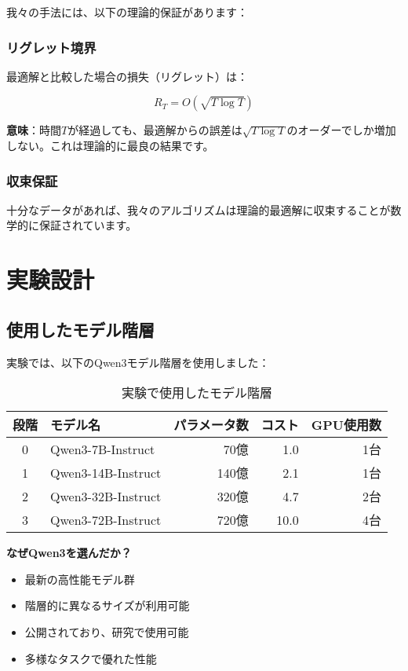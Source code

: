 \documentclass[a4paper,12pt]{jsarticle}
\begin{document}
我々の手法には、以下の理論的保証があります：

\subsubsection{リグレット境界}

最適解と比較した場合の損失（リグレット）は：

\begin{equation}
R_T = O(\sqrt{T \log T})
\end{equation}

\textbf{意味}：時間$T$が経過しても、最適解からの誤差は$\sqrt{T \log T}$のオーダーでしか増加しない。これは理論的に最良の結果です。

\subsubsection{収束保証}

十分なデータがあれば、我々のアルゴリズムは理論的最適解に収束することが数学的に保証されています。

\section{実験設計}

\subsection{使用したモデル階層}

実験では、以下のQwen3モデル階層を使用しました：

\begin{table}[H]
\centering
\caption{実験で使用したモデル階層}
\begin{tabular}{|c|l|r|r|r|}
\hline
\textbf{段階} & \textbf{モデル名} & \textbf{パラメータ数} & \textbf{コスト} & \textbf{GPU使用数} \\
\hline
0 & Qwen3-7B-Instruct & 70億 & 1.0 & 1台 \\
1 & Qwen3-14B-Instruct & 140億 & 2.1 & 1台 \\
2 & Qwen3-32B-Instruct & 320億 & 4.7 & 2台 \\
3 & Qwen3-72B-Instruct & 720億 & 10.0 & 4台 \\
\hline
\end{tabular}
\end{table}

\textbf{なぜQwen3を選んだか？}
\begin{itemize}
\item 最新の高性能モデル群
\item 階層的に異なるサイズが利用可能
\item 公開されており、研究で使用可能
\item 多様なタスクで優れた性能
\end{itemize}
\end{document}
